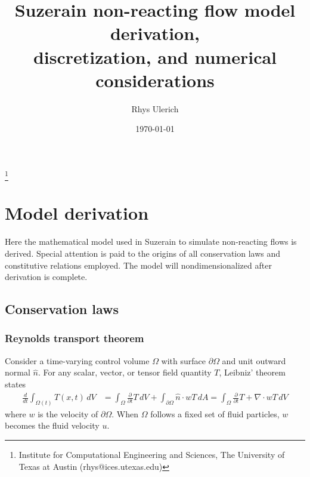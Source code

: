 \documentclass[letterpaper,11pt,nointlimits,reqno,draft]{amsart}
\begin{document}
\title{Suzerain non-reacting flow model derivation,\\
       discretization, and numerical considerations}
\author{Rhys Ulerich}
\date{\today}
\thanks{Institute for Computational
    Engineering and Sciences, The University of Texas at Austin
    (rhys@ices.utexas.edu)}

\maketitle
\renewcommand{\contentsname}{} %
\setcounter{tocdepth}{3}
\let\oldtocsection=\tocsection
\let\oldtocsubsection=\tocsubsection
\let\oldtocsubsubsection=\tocsubsubsection
\renewcommand{\tocsection}[2]{\hspace{0em}\oldtocsection{#1}{#2}}
\renewcommand{\tocsubsection}[2]{\hspace{1em}\oldtocsubsection{#1}{#2}}
\renewcommand{\tocsubsubsection}[2]{\hspace{2em}\oldtocsubsubsection{#1}{#2}}
\tableofcontents
\newpage

\section{Model derivation}
\label{sec:derivation}

Here the mathematical model used in Suzerain to simulate non-reacting flows is
derived.  Special attention is paid to the origins of all conservation laws and
constitutive relations employed.  The model will nondimensionalized after
derivation is complete.

\subsection{Conservation laws}

\subsubsection{Reynolds transport theorem}

Consider a time-varying control volume $\Omega$ with surface
$\partial\Omega$ and unit outward normal $\hat{n}$.  For any
scalar, vector, or tensor field quantity
$T$, Leibniz' theorem states
\begin{align}
  \label{eq:rtt}
  \frac{d}{dt}\int_{\Omega(t)}T(x,t)\,dV
  &=
  \int_{\Omega}\frac{\partial}{\partial{}t}T\,dV
  +
  \int_{\partial\Omega} \hat{n}\cdot{}w T\,dA
  =
  \int_{\Omega}\frac{\partial}{\partial{}t}T+\nabla\cdot{}wT\,dV
\end{align}
where $w$ is the velocity of $\partial\Omega$.  When $\Omega$ follows
a fixed set of fluid particles, $w$ becomes the fluid velocity $u$.
\end{document}
